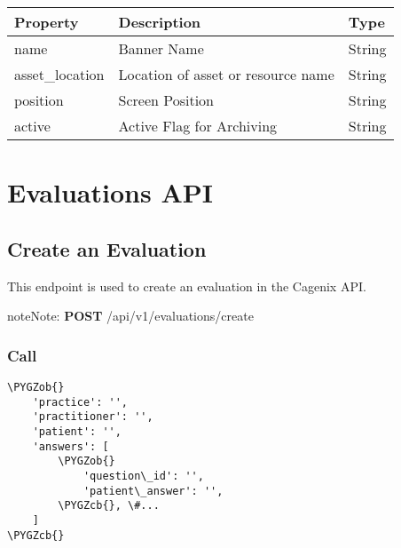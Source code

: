 \documentclass[letterpaper,10pt,english]{sphinxmanual}
\def\PYGZob{\char`\{}
\def\PYGZcb{\char`\}}
\begin{document}
\begin{tabulary}{\linewidth}{|L|L|L|}
\hline
\textsf{\relax 
Property
} & \textsf{\relax 
Description
} & \textsf{\relax 
Type
}\\
\hline
name
 & 
Banner Name
 & 
String
\\

asset\_location
 & 
Location of asset or resource name
 & 
String
\\

position
 & 
Screen Position
 & 
String
\\

active
 & 
Active Flag for Archiving
 & 
String
\\
\hline\end{tabulary}



\chapter{Evaluations API}
\label{dev-api-evaluations::doc}\label{dev-api-evaluations:evaluations-api}

\section{Create an Evaluation}
\label{dev-api-evaluations:create-an-evaluation}
This endpoint is used to create an evaluation in the Cagenix API.

\begin{notice}{note}{Note:}
\textbf{POST} /api/v1/evaluations/create
\end{notice}


\subsection{Call}
\label{dev-api-evaluations:call}
\begin{Verbatim}[commandchars=\\\{\}]
\PYGZob{}
    'practice': '',
    'practitioner': '',
    'patient': '',
    'answers': [
        \PYGZob{}
            'question\_id': '',
            'patient\_answer': '',
        \PYGZcb{}, \#...
    ]
\PYGZcb{}
\end{Verbatim}
\end{document}
